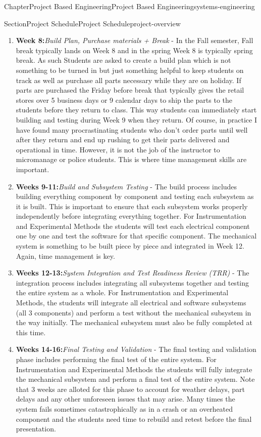 \documentclass[oneside,10pt,]{book}
\newcommand{\terminology}[1]{\textbf{#1}}
\numberwithin{equation}{section}
\begin{document}
\begin{chapterptx}{Chapter}{Project Based Engineering}{}{Project Based Engineering}{}{}{systems-engineering}
\begin{sectionptx}{Section}{Project Schedule}{}{Project Schedule}{}{}{project-overview}
\begin{enumerate}
\item{}\terminology{Week 8:}\emph{Build Plan, Purchase materials + Break} - In the Fall semester, Fall break typically lands on Week 8 and in the spring Week 8 is typically spring break. As such Students are asked to create a build plan which is not something to be turned in but just something helpful to keep students on track as well as purchase all parts necessary while they are on holiday. If parts are purchased the Friday before break that typically gives the retail stores over 5 business days or 9 calendar days to ship the parts to the students before they return to class. This way students can immediately start building and testing during Week 9 when they return. Of course, in practice I have found many procrastinating students who don't order parts until well after they return and end up rushing to get their parts delivered and operational in time. However, it is not the job of the instructor to micromanage or police students. This is where time management skills are important.%
\item{}\terminology{Weeks 9-11:}\emph{Build and Subsystem Testing} - The build process includes building everything component by component and testing each subsystem as it is built. This is important to ensure that each subsystem works properly independently before integrating everything together. For Instrumentation and Experimental Methods the students will test each electrical component one by one and test the software for that specific component. The mechanical system is something to be built piece by piece and integrated in Week 12. Again, time management is key.%
\item{}\terminology{Weeks 12-13:}\emph{System Integration and Test Readiness Review (TRR)} - The integration process includes integrating all subsystems together and testing the entire system as a whole. For Instrumentation and Experimental Methods, the students will integrate all electrical and software subsystems (all 3 components) and perform a test without the mechanical subsystem in the way initially. The mechanical subsystem must also be fully completed at this time.%
\item{}\terminology{Weeks 14-16:}\emph{Final Testing and Validation} - The final testing and validation phase includes performing the final test of the entire system. For Instrumentation and Experimental Methods the students will fully integrate the mechanical subsystem and perform a final test of the entire system. Note that 3 weeks are alloted for this phase to account for weather delays, part delays and any other unforeseen issues that may arise. Many times the system fails sometimes catastrophically as in a crash or an overheated component and the students need time to rebuild and retest before the final presentation.%

\end{enumerate}
\end{sectionptx}
\end{chapterptx}
\end{document}
